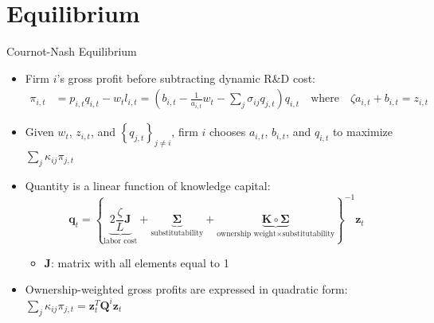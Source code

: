 \documentclass[english,aspectratio=169,handout]{beamer}
\theoremstyle{plain}
\newcommand{\mat}[1]{\bm{#1}}
\newcommand{\vect}[1]{\mathbf{#1}}
\begin{document}
\section{Equilibrium}

\begin{frame}{Cournot-Nash Equilibrium}
  \begin{itemize}
    \item \label{cournot}Firm $i$'s gross profit before subtracting dynamic
          R\&D cost:
          \begin{align*}
            \pi_{i,t} & =p_{i,t}q_{i,t}-w_{t}l_{i,t}=\left(b_{i,t}-\frac{1}{a_{i,t}}w_{t}-\sum_{j}\sigma_{ij}q_{j,t}\right)q_{i,t}\quad\text{where}\quad\zeta a_{i,t}+b_{i,t}=z_{i,t}
          \end{align*}
    \item Given $w_{t}$, $z_{i,t}$, and $\left\{ q_{j,t}\right\} _{j\neq i}$,
          firm $i$ chooses $a_{i,t}$, $b_{i,t}$, and $q_{i,t}$ to maximize
          $\sum_{j}\kappa_{ij}\pi_{j,t}$\pause\medskip{}
    \item Quantity is a linear function of knowledge capital:
          \[
            \vect{q}_{t}=\left\{ \underbrace{2\frac{\zeta}{L}\mat{J}}_{\text{labor cost}}+\underbrace{\mat{\Sigma}}_{\text{substitutability}}+\underbrace{\mat{K}\circ\mat{\Sigma}}_{\text{ownership weight}\times\text{substitutability}}\right\} ^{-1}\vect{z}_{t}
          \]

          \begin{itemize}
            \item $\mat{J}$: matrix with all elements equal to 1\medskip{}
          \end{itemize}
    \item Ownership-weighted gross profits are expressed in quadratic form:
          $\sum_{j}\kappa_{ij}\pi_{j,t}=\vect{z}_{t}^{T}\mat{Q}^{i}\vect{z}_{t}$
          \hyperlink{Q}{}
  \end{itemize}
\end{frame}
%
\end{document}
